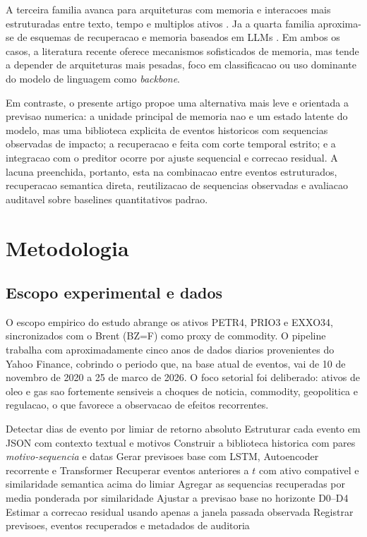 \documentclass[12pt]{article}
\begin{document}
A terceira familia avanca para arquiteturas com memoria e interacoes mais estruturadas entre texto, tempo e multiplos ativos \cite{Luo:2023}. Ja a quarta familia aproxima-se de esquemas de recuperacao e memoria baseados em LLMs \cite{Xiao:2025FinSrag, Wang:2025StockMem}. Em ambos os casos, a literatura recente oferece mecanismos sofisticados de memoria, mas tende a depender de arquiteturas mais pesadas, foco em classificacao ou uso dominante do modelo de linguagem como \textit{backbone}.

Em contraste, o presente artigo propoe uma alternativa mais leve e orientada a previsao numerica: a unidade principal de memoria nao e um estado latente do modelo, mas uma biblioteca explicita de eventos historicos com sequencias observadas de impacto; a recuperacao e feita com corte temporal estrito; e a integracao com o preditor ocorre por ajuste sequencial e correcao residual. A lacuna preenchida, portanto, esta na combinacao entre eventos estruturados, recuperacao semantica direta, reutilizacao de sequencias observadas e avaliacao auditavel sobre baselines quantitativos padrao.

\section{Metodologia}

\subsection{Escopo experimental e dados}

O escopo empirico do estudo abrange os ativos PETR4, PRIO3 e EXXO34, sincronizados com o Brent (BZ=F) como proxy de commodity. O pipeline trabalha com aproximadamente cinco anos de dados diarios provenientes do Yahoo Finance, cobrindo o periodo que, na base atual de eventos, vai de 10 de novembro de 2020 a 25 de marco de 2026. O foco setorial foi deliberado: ativos de oleo e gas sao fortemente sensiveis a choques de noticia, commodity, geopolitica e regulacao, o que favorece a observacao de efeitos recorrentes.

\begin{algorithm}[H]
\caption{Resumo do pipeline hibrido proposto}
\label{alg:pipeline}
\small
\begin{algorithmic}[1]
\STATE Detectar dias de evento por limiar de retorno absoluto
\STATE Estruturar cada evento em JSON com contexto textual e motivos
\STATE Construir a biblioteca historica com pares \textit{motivo-sequencia} e datas
\STATE Gerar previsoes base com LSTM, Autoencoder recorrente e Transformer
    \STATE Recuperar eventos anteriores a $t$ com ativo compativel e similaridade semantica acima do limiar
    \STATE Agregar as sequencias recuperadas por media ponderada por similaridade
    \STATE Ajustar a previsao base no horizonte D0--D4
    \STATE Estimar a correcao residual usando apenas a janela passada observada
\ENDFOR
\STATE Registrar previsoes, eventos recuperados e metadados de auditoria
\end{algorithmic}
\end{algorithm}
\end{document}
